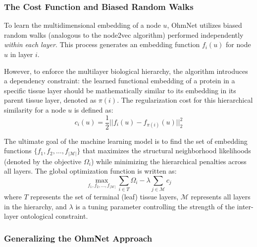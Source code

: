 
\subsubsection{The Cost Function and Biased Random Walks}
\label{subsubsec:ohmnet_cost_function}

To learn the multidimensional embedding of a node $u$, OhmNet utilizes biased random walks (analogous to the node2vec algorithm) performed independently \textit{within each layer}. This process generates an embedding function $f_i(u)$ for node $u$ in layer $i$.

However, to enforce the multilayer biological hierarchy, the algorithm introduces a dependency constraint: the learned functional embedding of a protein in a specific tissue layer should be mathematically similar to its embedding in its parent tissue layer, denoted as $\pi(i)$. The regularization cost for this hierarchical similarity for a node $u$ is defined as:
\[
    c_i(u) = \frac{1}{2} || f_i(u) - f_{\pi(i)}(u) ||_2^2
\]

The ultimate goal of the machine learning model is to find the set of embedding functions $\{f_1, f_2, \dots, f_{|\mathcal{M}|}\}$ that maximizes the structural neighborhood likelihoods (denoted by the objective $\Omega_i$) while minimizing the hierarchical penalties across all layers. The global optimization function is written as:
\[
    \max_{f_1, f_2, \dots, f_{|\mathcal{M}|}} \sum_{i \in T} \Omega_i - \lambda \sum_{j \in \mathcal{M}} c_j
\]
where $T$ represents the set of terminal (leaf) tissue layers, $\mathcal{M}$ represents all layers in the hierarchy, and $\lambda$ is a tuning parameter controlling the strength of the inter-layer ontological constraint.


\subsubsection{Generalizing the OhmNet Approach}
\label{subsubsec:generalizing_ohmnet}

